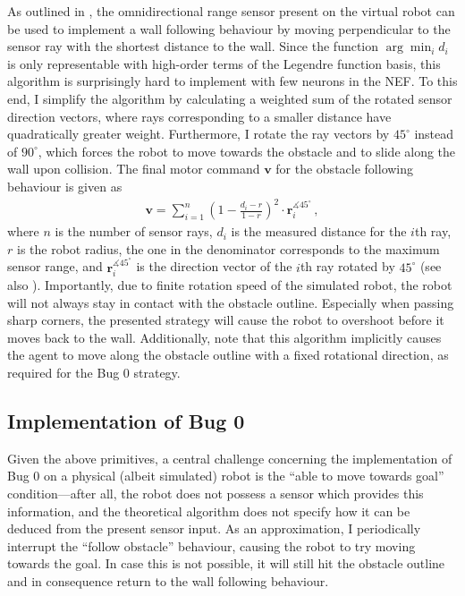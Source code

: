 \documentclass[letterpaper,10pt,conference]{ieeeconf}
\renewcommand{\vec}[1]{\bm{#1}}
\begin{document}
As outlined in \cite{yata1998wall}, the omnidirectional range sensor present on the virtual robot can be used to implement a wall following behaviour by moving perpendicular to the sensor ray with the shortest distance to the wall. Since the function $\arg\min_i d_i$ is only representable with high-order terms of the Legendre function basis, this algorithm is surprisingly hard to implement with few neurons in the NEF. To this end, I simplify the algorithm by calculating a weighted sum of the rotated sensor direction vectors, where rays corresponding to a smaller distance have quadratically greater weight. Furthermore, I rotate the ray vectors by $45^\circ$ instead of $90^\circ$, which forces the robot to move towards the obstacle and to slide along the wall upon collision. The final motor command $\vec v$ for the obstacle following behaviour is given as
\begin{align*}
	\vec v = \sum_{i = 1}^n \left( 1 - \frac{d_i - r}{1 - r} \right)^2 \cdot \vec r_i^{\measuredangle 45^\circ} \,,
\end{align*}
where $n$ is the number of sensor rays, $d_i$ is the measured distance for the $i$th ray, $r$ is the robot radius, the one in the denominator corresponds to the maximum sensor range, and $\vec r_i^{\measuredangle 45^\circ}$ is the direction vector of the $i$th ray rotated by $45^\circ$ (see also ). Importantly, due to finite rotation speed of the simulated robot, the robot will not always stay in contact with the obstacle outline. Especially when passing sharp corners, the presented strategy will cause the robot to overshoot before it moves back to the wall. Additionally, note that this algorithm implicitly causes the agent to move along the obstacle outline with a fixed rotational direction, as required for the Bug 0 strategy.

\subsection{Implementation of Bug 0}

Given the above primitives, a central challenge concerning the implementation of Bug 0 on a physical (albeit simulated) robot is the \enquote{able to move towards goal} condition---after all, the robot does not possess a sensor which provides this information, and the theoretical algorithm does not specify how it can be deduced from the present sensor input. As an approximation, I periodically interrupt the \enquote{follow obstacle} behaviour, causing the robot to try moving towards the goal. In case this is not possible, it will still hit the obstacle outline and in consequence return to the wall following behaviour.
\end{document}
